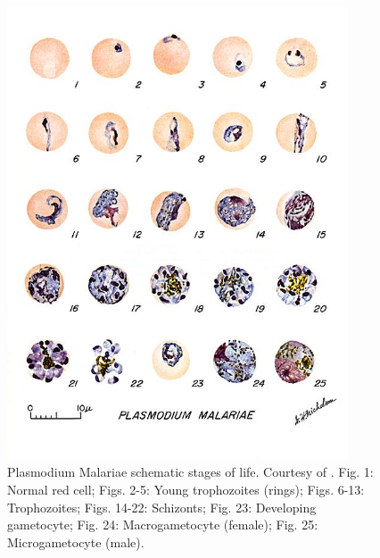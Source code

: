 \begin{figure}[!htbp]
	\centering
	\includegraphics[width=0.90\textwidth]{images/malaria_th/mal_mal}
	\caption[Plasmodium Malariae's stages of life.]{\label{fig:mal_th} Plasmodium Malariae schematic stages of life. Courtesy of \cite{Med_cdc}.
		Fig. 1: Normal red cell; Figs. 2-5: Young trophozoites (rings); Figs. 6-13: Trophozoites; Figs. 14-22: Schizonts; Fig. 23: Developing gametocyte; Fig. 24: Macrogametocyte (female); Fig. 25: Microgametocyte (male).}
\end{figure}

